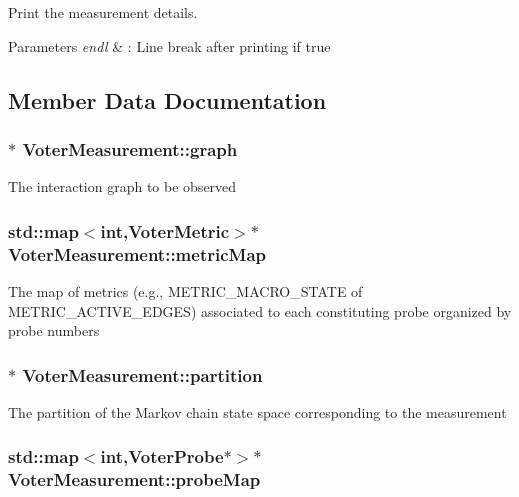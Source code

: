 Print the measurement details. 


\begin{DoxyParams}{Parameters}
{\em endl} & \-: Line break after printing if true \\
\hline
\end{DoxyParams}


\subsection{Member Data Documentation}
\hypertarget{class_voter_measurement_a8d22d4b78f7e2f4c747f5716c4885351}{
\subsubsection[{graph}]{$\ast$ Voter\-Measurement\-::graph}}\label{class_voter_measurement_a8d22d4b78f7e2f4c747f5716c4885351}
The interaction graph to be observed \hypertarget{class_voter_measurement_a27a9133a8ff11810c10c06b647a3ce85}{
\subsubsection[{metric\-Map}]{\setlength{\rightskip}{0pt plus 5cm}std\-::map$<$int,{\bf Voter\-Metric}$>$$\ast$ Voter\-Measurement\-::metric\-Map}}\label{class_voter_measurement_a27a9133a8ff11810c10c06b647a3ce85}
The map of metrics (e.\-g., M\-E\-T\-R\-I\-C\-\_\-\-M\-A\-C\-R\-O\-\_\-\-S\-T\-A\-T\-E of M\-E\-T\-R\-I\-C\-\_\-\-A\-C\-T\-I\-V\-E\-\_\-\-E\-D\-G\-E\-S) associated to each constituting probe organized by probe numbers \hypertarget{class_voter_measurement_aa3879b092c573e4ba4f45531a4f57e5b}{
\subsubsection[{partition}]{$\ast$ Voter\-Measurement\-::partition}}\label{class_voter_measurement_aa3879b092c573e4ba4f45531a4f57e5b}
The partition of the Markov chain state space corresponding to the measurement \hypertarget{class_voter_measurement_abdee5af4a48de3334ace791912033e28}{
\subsubsection[{probe\-Map}]{\setlength{\rightskip}{0pt plus 5cm}std\-::map$<$int,{\bf Voter\-Probe}$\ast$$>$$\ast$ Voter\-Measurement\-::probe\-Map}}\label{class_voter_measurement_abdee5af4a48de3334ace791912033e28}
